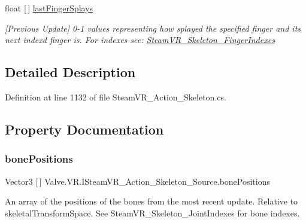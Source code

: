 \begin{DoxyCompactItemize}
float \mbox{[}$\,$\mbox{]} \mbox{\hyperlink{interface_valve_1_1_v_r_1_1_i_steam_v_r___action___skeleton___source_ad38ea0c71b903fbc01e86f51aef95b94}{last\+Finger\+Splays}}
\begin{DoxyCompactList}\small\item\em \mbox{[}Previous Update\mbox{]} 0-\/1 values representing how splayed the specified finger and it\textquotesingle{}s next index\textquotesingle{}d finger is. For indexes see\+: \mbox{\hyperlink{class_valve_1_1_v_r_1_1_steam_v_r___skeleton___finger_indexes}{Steam\+V\+R\+\_\+\+Skeleton\+\_\+\+Finger\+Indexes}} \end{DoxyCompactList}\end{DoxyCompactItemize}


\subsection{Detailed Description}


Definition at line 1132 of file Steam\+V\+R\+\_\+\+Action\+\_\+\+Skeleton.\+cs.



\subsection{Property Documentation}
\mbox{\label{interface_valve_1_1_v_r_1_1_i_steam_v_r___action___skeleton___source_a6b9c8ff6ed0dc469ce0e08a97430eb86}} 
\subsubsection{\texorpdfstring{bonePositions}{bonePositions}}
{\footnotesize\ttfamily Vector3 \mbox{[}$\,$\mbox{]} Valve.\+V\+R.\+I\+Steam\+V\+R\+\_\+\+Action\+\_\+\+Skeleton\+\_\+\+Source.\+bone\+Positions\hspace{0.3cm}{\ttfamily [get]}}



An array of the positions of the bones from the most recent update. Relative to skeletal\+Transform\+Space. See Steam\+V\+R\+\_\+\+Skeleton\+\_\+\+Joint\+Indexes for bone indexes. 



